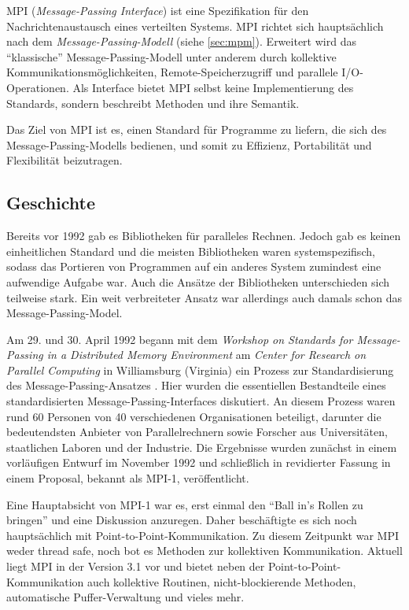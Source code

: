     MPI (\textit{Message-Passing Interface}) ist eine Spezifikation für den Nachrichtenaustausch eines verteilten Systems. MPI richtet sich hauptsächlich nach dem 
    \textit{Message-Passing-Modell} (siehe \autoref{sec:mpm}).
    Erweitert wird das ``klassische'' Message-Passing-Modell unter anderem durch kollektive Kommunikationsmöglichkeiten, Remote-Speicherzugriff und parallele I/O-Operationen.
    Als Interface bietet MPI selbst keine Implementierung des Standards, sondern beschreibt Methoden und ihre Semantik.
    
    Das Ziel von MPI ist es, einen Standard für Programme zu liefern, die sich des Message-Passing-Modells bedienen, und somit zu Effizienz, Portabilität und Flexibilität
    beizutragen. \citep{mpiv31}
    
    \subsection{Geschichte}
      Bereits vor 1992 gab es Bibliotheken für paralleles Rechnen. Jedoch gab es keinen einheitlichen Standard und die meisten Bibliotheken waren systemspezifisch,
      sodass das Portieren von Programmen auf ein anderes System zumindest eine aufwendige Aufgabe war. Auch die Ansätze der Bibliotheken unterschieden sich teilweise
      stark. Ein weit verbreiteter Ansatz war allerdings auch damals schon das Message-Passing-Model. \citep{mpitut}
      
      Am 29. und 30. April 1992 begann mit dem \textit{Workshop on Standards for Message-Passing in a Distributed Memory Environment} am \textit{Center for Research on Parallel 
      Computing} in Williamsburg (Virginia) ein Prozess zur Standardisierung des Message-Passing-Ansatzes \citep{workshop}. Hier wurden die essentiellen Bestandteile eines 
      standardisierten Message-Passing-Interfaces diskutiert. An diesem Prozess waren rund 60 Personen von 40 verschiedenen Organisationen beteiligt, darunter die bedeutendsten
      Anbieter von Parallelrechnern sowie Forscher aus Universitäten, staatlichen Laboren und der Industrie. Die Ergebnisse wurden zunächst in einem vorläufigen Entwurf im
      November 1992 und schließlich in revidierter Fassung in einem Proposal, bekannt als MPI-1, veröffentlicht. \citep{mpi1}
      
      Eine Hauptabsicht von MPI-1 war es, erst einmal den ``Ball in's Rollen zu bringen'' und eine Diskussion anzuregen. Daher beschäftigte es sich noch hauptsächlich
      mit Point-to-Point-Kommunikation. Zu diesem Zeitpunkt war MPI weder thread safe, noch bot es Methoden zur kollektiven Kommunikation. Aktuell liegt MPI in der Version 3.1
      vor und bietet neben der Point-to-Point-Kommunikation auch kollektive Routinen, nicht-blockierende Methoden, automatische Puffer-Verwaltung und vieles mehr. \citep{mpiv31}
      
